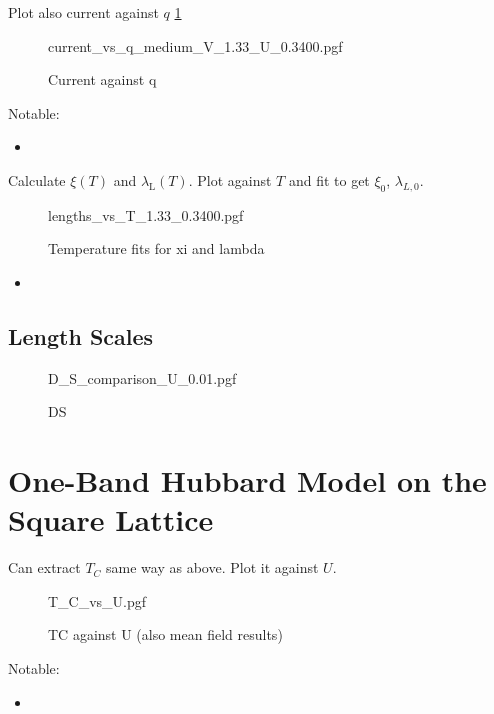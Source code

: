 \documentclass[../notes.tex]{subfiles}
\begin{document}
Plot also current against \(q\) \cref{fig:decorated graphene current vs q}
\begin{figure}[H]
	\centering
	{current_vs_q_medium_V_1.33_U_0.3400.pgf}
	\caption{Current against q}
	\label{fig:decorated graphene current vs q}
\end{figure}
Notable:
\begin{itemize}
	\item
\end{itemize}

Calculate \(\xi (T)\) and \(\lambda_{\mathrm{L}} (T)\).
Plot against \(T\) and fit to get \(\xi_0\), \(\lambda_{L,0}\).
\begin{figure}[H]
	\centering
	{lengths_vs_T_1.33_0.3400.pgf}
	\caption{Temperature fits for xi and lambda}
	\label{fig:decorated graphene temperature fits for xi and lambda}
\end{figure}
\begin{itemize}
	\item
\end{itemize}

\subsection*{Length Scales}


\begin{figure}[H]
	\centering
	{D_S_comparison_U_0.01.pgf}
	\caption{DS}
	\label{fig:decorated graphene compariosn of DS}
\end{figure}

\section{One-Band Hubbard Model on the Square Lattice}

Can extract \(T_C\) same way as above.
Plot it against \(U\).
\begin{figure}[H]
	\centering
	{T_C_vs_U.pgf}
	\caption{TC against U (also mean field results)}
	\label{fig:DMFT OBH T_C vs U}
\end{figure}
Notable:
\begin{itemize}
	\item
\end{itemize}
\end{document}
